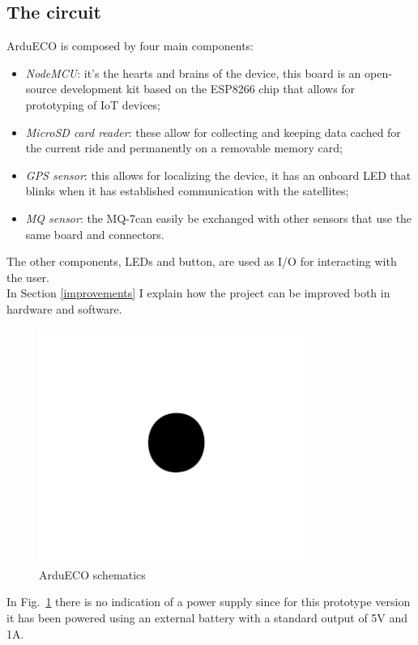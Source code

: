 \documentclass[conference]{IEEEtran}
\begin{document}
	\subsection{The circuit}\label{circuit}
	
		ArduECO is composed by four main components:
		\begin{itemize}
			\item \textit{NodeMCU}: it's the hearts and brains of the device, this board is an open-source development kit based on the ESP8266 chip that allows for prototyping of IoT devices;
			\item \textit{MicroSD card reader}: these allow for collecting and keeping data cached for the current ride and permanently on a removable memory card;
			\item \textit{GPS sensor}: this allows for localizing the device, it has an onboard LED that blinks when it has established communication with the satellites;
			\item \textit{MQ sensor}: the MQ-7can easily be exchanged with other sensors that use the same board and connectors.
		\end{itemize}
		The other components, LEDs and button, are used as I/O for interacting with the user.\\
		In Section \ref{improvements} I explain how the project can be improved both in hardware and software.
		\begin{figure}[htbp]
			\centerline{\includegraphics[width=8.8cm]{fig1.png}}
			\caption{ArduECO schematics}
			\label{schematics}
		\end{figure}
		In Fig.~\ref{schematics} there is no indication of a power supply since for this prototype version it has been powered using an external battery with a standard output of 5V and 1A.
	
\end{document}
